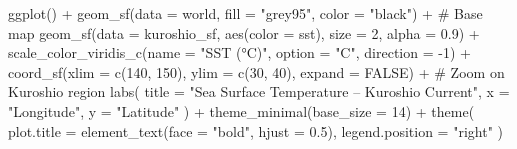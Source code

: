 \documentclass[
  11pt,
]{article}
\newenvironment{Shaded}{\begin{snugshade}}{\end{snugshade}}
\newcommand{\AttributeTok}[1]{\textcolor[rgb]{0.40,0.45,0.13}{#1}}
\newcommand{\CommentTok}[1]{\textcolor[rgb]{0.37,0.37,0.37}{#1}}
\newcommand{\ConstantTok}[1]{\textcolor[rgb]{0.56,0.35,0.01}{#1}}
\newcommand{\DecValTok}[1]{\textcolor[rgb]{0.68,0.00,0.00}{#1}}
\newcommand{\FloatTok}[1]{\textcolor[rgb]{0.68,0.00,0.00}{#1}}
\newcommand{\FunctionTok}[1]{\textcolor[rgb]{0.28,0.35,0.67}{#1}}
\newcommand{\NormalTok}[1]{\textcolor[rgb]{0.00,0.23,0.31}{#1}}
\newcommand{\SpecialCharTok}[1]{\textcolor[rgb]{0.37,0.37,0.37}{#1}}
\newcommand{\StringTok}[1]{\textcolor[rgb]{0.13,0.47,0.30}{#1}}
\begin{document}
\begin{Shaded}
\begin{Highlighting}[]
\FunctionTok{ggplot}\NormalTok{() }\SpecialCharTok{+}
  \FunctionTok{geom\_sf}\NormalTok{(}\AttributeTok{data =}\NormalTok{ world, }\AttributeTok{fill =} \StringTok{"grey95"}\NormalTok{, }\AttributeTok{color =} \StringTok{"black"}\NormalTok{) }\SpecialCharTok{+}  \CommentTok{\# Base map}
  \FunctionTok{geom\_sf}\NormalTok{(}\AttributeTok{data =}\NormalTok{ kuroshio\_sf, }\FunctionTok{aes}\NormalTok{(}\AttributeTok{color =}\NormalTok{ sst), }\AttributeTok{size =} \DecValTok{2}\NormalTok{, }\AttributeTok{alpha =} \FloatTok{0.9}\NormalTok{) }\SpecialCharTok{+}
  \FunctionTok{scale\_color\_viridis\_c}\NormalTok{(}\AttributeTok{name =} \StringTok{"SST (°C)"}\NormalTok{, }\AttributeTok{option =} \StringTok{"C"}\NormalTok{, }\AttributeTok{direction =} \SpecialCharTok{{-}}\DecValTok{1}\NormalTok{) }\SpecialCharTok{+}
  \FunctionTok{coord\_sf}\NormalTok{(}\AttributeTok{xlim =} \FunctionTok{c}\NormalTok{(}\DecValTok{140}\NormalTok{, }\DecValTok{150}\NormalTok{), }\AttributeTok{ylim =} \FunctionTok{c}\NormalTok{(}\DecValTok{30}\NormalTok{, }\DecValTok{40}\NormalTok{), }\AttributeTok{expand =} \ConstantTok{FALSE}\NormalTok{) }\SpecialCharTok{+}  
  \CommentTok{\# Zoom on Kuroshio region}
  \FunctionTok{labs}\NormalTok{(}
    \AttributeTok{title =} \StringTok{"Sea Surface Temperature – Kuroshio Current"}\NormalTok{,}
    \AttributeTok{x =} \StringTok{"Longitude"}\NormalTok{, }\AttributeTok{y =} \StringTok{"Latitude"}
\NormalTok{  ) }\SpecialCharTok{+}
  \FunctionTok{theme\_minimal}\NormalTok{(}\AttributeTok{base\_size =} \DecValTok{14}\NormalTok{) }\SpecialCharTok{+}
  \FunctionTok{theme}\NormalTok{(}
    \AttributeTok{plot.title =} \FunctionTok{element\_text}\NormalTok{(}\AttributeTok{face =} \StringTok{"bold"}\NormalTok{, }\AttributeTok{hjust =} \FloatTok{0.5}\NormalTok{),}
    \AttributeTok{legend.position =} \StringTok{"right"}
\NormalTok{  )}
\end{Highlighting}
\end{Shaded}
\end{document}
